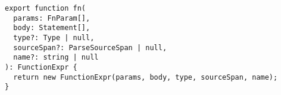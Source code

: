 \begin{verbatim}
export function fn(
  params: FnParam[],
  body: Statement[],
  type?: Type | null,
  sourceSpan?: ParseSourceSpan | null,
  name?: string | null
): FunctionExpr {
  return new FunctionExpr(params, body, type, sourceSpan, name);
}
\end{verbatim}
